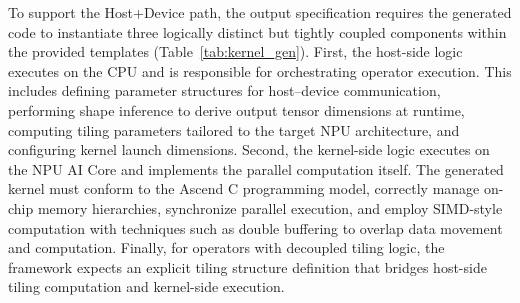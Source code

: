 To support the Host+Device path, the output specification requires the generated code to instantiate three logically distinct but tightly coupled components within the provided templates (Table~\ref{tab:kernel_gen}). First, the host-side logic executes on the CPU and is responsible for orchestrating operator execution. This includes defining parameter structures for host–device communication, performing shape inference to derive output tensor dimensions at runtime, computing tiling parameters tailored to the target NPU architecture, and configuring kernel launch dimensions. Second, the kernel-side logic executes on the NPU AI Core and implements the parallel computation itself. The generated kernel must conform to the Ascend C programming model, correctly manage on-chip memory hierarchies, synchronize parallel execution, and employ SIMD-style computation with techniques such as double buffering to overlap data movement and computation. Finally, for operators with decoupled tiling logic, the framework expects an explicit tiling structure definition that bridges host-side tiling computation and kernel-side execution.

